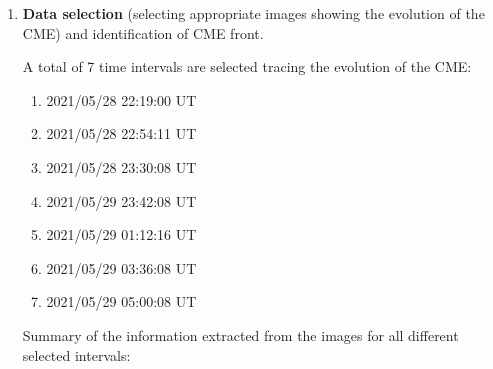 \begin{enumerate}
\item \textbf{Data selection} (selecting appropriate images showing the
  evolution of the CME) and identification of CME front.


  A total of 7 time intervals are selected tracing the evolution of the CME:
  \begin{enumerate}
  \item 2021/05/28 22:19:00 UT
  \item 2021/05/28 22:54:11 UT
  \item 2021/05/28 23:30:08 UT
  \item 2021/05/29 23:42:08 UT
  \item 2021/05/29 01:12:16 UT
  \item 2021/05/29 03:36:08 UT
  \item 2021/05/29 05:00:08 UT
  \end{enumerate}

  Summary of the information extracted from the images for all different
  selected intervals:


\end{enumerate}
